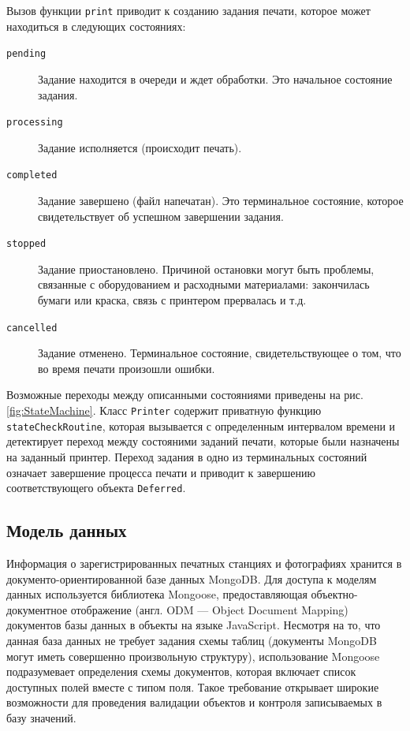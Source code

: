 \documentclass[a4paper,14pt,href]{article}
\begin{document}
Вызов функции \texttt{print} приводит к созданию задания печати, которое может находиться в следующих состояниях:
\begin{description}
  \item[\texttt{pending}] Задание находится в очереди и ждет обработки. Это начальное состояние задания.
  \item[\texttt{processing}] Задание исполняется (происходит печать).
  \item[\texttt{completed}] Задание завершено (файл напечатан). Это терминальное состояние, которое свидетельствует
  об успешном завершении задания.
  \item[\texttt{stopped}] Задание приостановлено. Причиной остановки могут быть проблемы, связанные с оборудованием и
  расходными материалами: закончилась бумаги или краска, связь с принтером прервалась и т.д.
  \item[\texttt{cancelled}] Задание отменено. Терминальное состояние, свидетельствующее о том, что во время печати
  произошли ошибки.
\end{description}

Возможные переходы между описанными состояниями приведены на рис. \ref{fig:StateMachine}. Класс \texttt{Printer} содержит
приватную функцию \texttt{stateCheckRou\-ti\-ne}, которая вызывается с определенным интервалом времени и детектирует
переход между состояними заданий печати, которые были назначены на заданный принтер. Переход задания в одно из терминальных
состояний означает завершение процесса печати и приводит к завершению соответствующего объекта \texttt{Deferred}.

\subsection{Модель данных}
Информация о зарегистрированных печатных станциях и фотографиях хранится в документо-ориентированной базе данных MongoDB.
Для доступа к моделям данных используется библиотека Mongoose\cite{Mongoose}, предоставляющая объектно-документное отображение
(англ. ODM \- --- Object Document Mapping) документов базы данных в объекты на языке JavaScript. Несмотря на то, что данная
база данных не требует задания схемы таблиц (документы MongoDB могут иметь совершенно произвольную структуру), использование
Mongoose подразумевает определения схемы документов, которая включает список доступных полей вместе с типом поля. Такое
требование открывает широкие возможности для проведения валидации объектов и контроля записываемых в базу значений.
\end{document}
